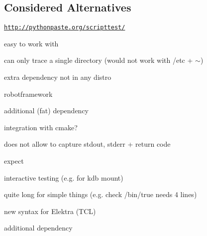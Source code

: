 \subsection*{Considered Alternatives}


\begin{DoxyItemize}
\item \href{http://pythonpaste.org/scripttest/}{\tt http\+://pythonpaste.\+org/scripttest/}
\begin{DoxyItemize}
\item easy to work with
\item can only trace a single directory (would not work with /etc + $\sim$)
\item extra dependency not in any distro
\end{DoxyItemize}
\item robotframework
\begin{DoxyItemize}
\item additional (fat) dependency
\item integration with cmake?
\item does not allow to capture stdout, stderr + return code
\end{DoxyItemize}
\item expect
\begin{DoxyItemize}
\item interactive testing (e.\+g. for kdb mount)
\item quite long for simple things (e.\+g. check /bin/true needs 4 lines)
\item new syntax for Elektra (T\+C\+L)
\item additional dependency 
\end{DoxyItemize}
\end{DoxyItemize}